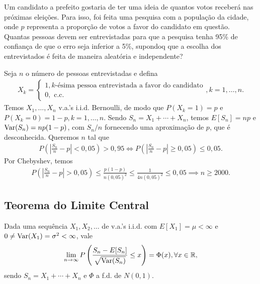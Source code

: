 \documentclass[../Notas.tex]{subfiles}
\begin{document}
\begin{example}
Um candidato a prefeito gostaria de ter uma ideia de quantos votos receberá nas próximas eleições. Para isso, foi feita uma pesquisa com a população da cidade, onde $p$ representa a proporção de votos a favor do candidato em questão. Quantas pessoas devem ser entrevistadas para que a pesquisa tenha 95\% de confiança de que o erro seja inferior a 5\%, supondoq que a escolha dos entrevistados é feita de maneira aleatória e independente?

Seja $n$ o número de pessoas entrevistadas e defina
\begin{align*}
    X_k = \begin{cases}
    1, k\text{-ésima pessoa entrevistada a favor do candidato} \\
    0, \text{ c.c.}
    \end{cases}, k = 1, \dots, n.
\end{align*}
Temos $X_1, \dots, X_n$ v.a.'s i.i.d. Bernoulli, de modo que $P(X_k = 1) = p$ e $P(X_k = 0) = 1-p, k=1,\dots,n$. Sendo $S_n = X_1 + \cdots + X_n$, temos $E[S_n] = np$ e $\text{Var}(S_n) = np(1-p)$, com $S_n/n$ fornecendo uma aproximação de $p$, que é desconhecida. Queremos $n$ tal que
\begin{align*}
    P\left( \left| \frac{S_n}{n} - p \right| < 0,05 \right) > 0,95 \iff P\left( \left| \frac{S_n}{n} - p \right| \geq 0,05 \right) \leq 0,05.
\end{align*}
Por Chebyshev, temos
\begin{align*}
    P\left( \left| \frac{S_n}{n} - p \right| > 0,05 \right) \leq \frac{p(1-p)}{n(0,05)^2} \leq \frac{1}{4n(0,05)^2} \leq 0,05 \implies n\geq 2000.
\end{align*}
\end{example}

\subsection{Teorema do Limite Central}
\begin{theorem}
Dada uma sequência $X_1, X_2, \dots$ de v.a.'s i.i.d. com $E[X_1] = \mu < \infty$ e $0\neq \text{Var}(X_1) = \sigma^2 < \infty$, vale
\begin{align*}
    \lim_{n\to\infty} P\left( \frac{S_n - E[S_n]}{\sqrt{\text{Var}(S_n)}} \leq x \right) = \Phi(x), \forall x\in\mathbb{R},
\end{align*}
sendo $S_n = X_1 + \cdots + X_n$ e $\Phi$ a f.d. de $N(0,1)$.
\end{theorem}
\end{document}
